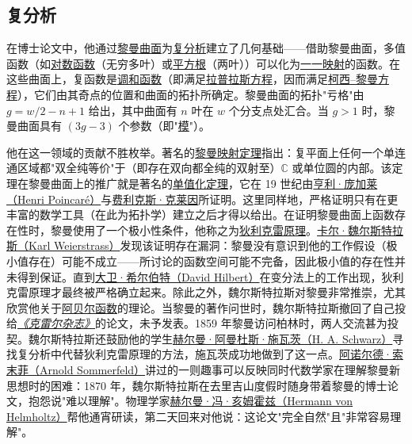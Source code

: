 \subsection{复分析}\label{Complex_analysis}

在博士论文中，他通过\href{https://en.wikipedia.org/wiki/Riemann_surface}{黎曼曲面}为\href{https://en.wikipedia.org/wiki/Complex_analysis}{复分析}建立了几何基础——借助黎曼曲面，多值函数（如\href{https://en.wikipedia.org/wiki/Logarithm}{对数函数}（无穷多叶）或\href{https://en.wikipedia.org/wiki/Square_root}{平方根}（两叶））可以化为\href{https://en.wikipedia.org/wiki/One-to-one_function}{一一映射}的函数。在这些曲面上，复函数是\href{https://en.wikipedia.org/wiki/Harmonic_functions}{调和函数}（即满足\href{https://en.wikipedia.org/wiki/Laplace's_equation}{拉普拉斯方程}，因而满足\href{https://en.wikipedia.org/wiki/Cauchy–Riemann_equations}{柯西--黎曼方程}），它们由其奇点的位置和曲面的拓扑所确定。黎曼曲面的拓扑"亏格"由 {{\(g = w/2 - n + 1\)}{}} 给出，其中曲面有 {{\(n\)}{}} 叶在 {{\(w\)}{}} 个分支点处汇合。当 {{\(g > 1\)}{}} 时，黎曼曲面具有 {{\((3g - 3)\)}{}} 个参数（即"\href{https://en.wikipedia.org/wiki/Moduli_of_algebraic_curves}{模}"）。

他在这一领域的贡献不胜枚举。著名的\href{https://en.wikipedia.org/wiki/Riemann_mapping_theorem}{黎曼映射定理}指出：复平面上任何一个单连通区域都"双全纯等价"于（即存在双向都全纯的双射至）{{\(\mathbb{C}\)}{}} 或单位圆的内部。该定理在黎曼曲面上的推广就是著名的\href{https://en.wikipedia.org/wiki/Uniformization_theorem}{单值化定理}，它在 19 世纪由\href{https://en.wikipedia.org/wiki/Henri_Poincaré}{亨利·庞加莱（Henri Poincaré）}与\href{https://en.wikipedia.org/wiki/Felix_Klein}{费利克斯·克莱因}所证明。这里同样地，严格证明只有在更丰富的数学工具（在此为拓扑学）建立之后才得以给出。在证明黎曼曲面上函数存在性时，黎曼使用了一个极小性条件，他称之为\href{https://en.wikipedia.org/wiki/Dirichlet_principle}{狄利克雷原理}。\href{https://en.wikipedia.org/wiki/Karl_Weierstrass}{卡尔·魏尔斯特拉斯（Karl Weierstrass）}发现该证明存在漏洞：黎曼没有意识到他的工作假设（极小值存在）可能不成立——所讨论的函数空间可能不完备，因此极小值的存在性并未得到保证。直到\href{https://en.wikipedia.org/wiki/David_Hilbert}{大卫·希尔伯特（David Hilbert）}在变分法上的工作出现，狄利克雷原理才最终被严格确立起来。除此之外，魏尔斯特拉斯对黎曼非常推崇，尤其欣赏他关于\href{https://en.wikipedia.org/wiki/Abelian_function}{阿贝尔函数}的理论。当黎曼的著作问世时，魏尔斯特拉斯撤回了自己投给\emph{\href{https://en.wikipedia.org/wiki/Crelle's_Journal}{《克雷尔杂志》}}的论文，未予发表。1859 年黎曼访问柏林时，两人交流甚为投契。魏尔斯特拉斯还鼓励他的学生\href{https://en.wikipedia.org/wiki/Hermann_Amandus_Schwarz}{赫尔曼·阿曼杜斯·施瓦茨（H. A. Schwarz）}寻找复分析中代替狄利克雷原理的方法，施瓦茨成功地做到了这一点。\href{https://en.wikipedia.org/wiki/Arnold_Sommerfeld}{阿诺尔德·索末菲（Arnold Sommerfeld）}讲过的一则趣事可以反映同时代数学家在理解黎曼新思想时的困难：1870 年，魏尔斯特拉斯在去里吉山度假时随身带着黎曼的博士论文，抱怨说"难以理解"。物理学家\href{https://en.wikipedia.org/wiki/Hermann_von_Helmholtz}{赫尔曼·冯·亥姆霍兹（Hermann von Helmholtz）}帮他通宵研读，第二天回来对他说：这论文"完全自然"且"非常容易理解"。

